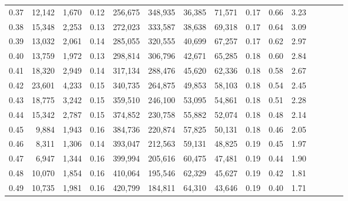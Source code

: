 \begin{tabular}{rrrcrrrrrrrrrrr}
0.37 &  12,142 &   1,670 &                                       0.12 &  256,675 &  348,935 &   36,385 &  71,571 &  0.17 &  0.66 &                         3.23 \\
0.38 &  15,348 &   2,253 &                                       0.13 &  272,023 &  333,587 &   38,638 &  69,318 &  0.17 &  0.64 &                         3.09 \\
0.39 &  13,032 &   2,061 &                                       0.14 &  285,055 &  320,555 &   40,699 &  67,257 &  0.17 &  0.62 &                         2.97 \\
0.40 &  13,759 &   1,972 &                                       0.13 &  298,814 &  306,796 &   42,671 &  65,285 &  0.18 &  0.60 &                         2.84 \\
0.41 &  18,320 &   2,949 &                                       0.14 &  317,134 &  288,476 &   45,620 &  62,336 &  0.18 &  0.58 &                         2.67 \\
0.42 &  23,601 &   4,233 &                                       0.15 &  340,735 &  264,875 &   49,853 &  58,103 &  0.18 &  0.54 &                         2.45 \\
0.43 &  18,775 &   3,242 &                                       0.15 &  359,510 &  246,100 &   53,095 &  54,861 &  0.18 &  0.51 &                         2.28 \\
0.44 &  15,342 &   2,787 &                                       0.15 &  374,852 &  230,758 &   55,882 &  52,074 &  0.18 &  0.48 &                         2.14 \\
0.45 &   9,884 &   1,943 &                                       0.16 &  384,736 &  220,874 &   57,825 &  50,131 &  0.18 &  0.46 &                         2.05 \\
0.46 &   8,311 &   1,306 &                                       0.14 &  393,047 &  212,563 &   59,131 &  48,825 &  0.19 &  0.45 &                         1.97 \\
0.47 &   6,947 &   1,344 &                                       0.16 &  399,994 &  205,616 &   60,475 &  47,481 &  0.19 &  0.44 &                         1.90 \\
0.48 &  10,070 &   1,854 &                                       0.16 &  410,064 &  195,546 &   62,329 &  45,627 &  0.19 &  0.42 &                         1.81 \\
0.49 &  10,735 &   1,981 &                                       0.16 &  420,799 &  184,811 &   64,310 &  43,646 &  0.19 &  0.40 &                         1.71 \\

\end{tabular}
